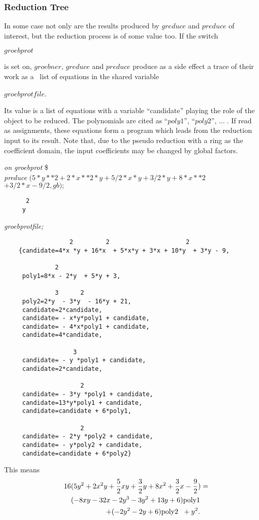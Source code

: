 \subsubsection{Reduction Tree}
In some case not only are the results produced by $greduce$ and
$preduce$ of interest, but the reduction process is of some value
too. If the switch
\begin{center}
$groebprot$
\end{center}
is set on, $groebner$, $greduce$ and $preduce$ produce as a side effect
a trace of their work as a \REDUCE \  list of equations in the shared variable
\begin{center}
$groebprotfile$.
\end{center}
Its value is a list of equations with a variable ``candidate'' playing
the role of the object to be reduced. The polynomials are cited as
``$poly1$'', ``$poly2$'', $\ldots\;$. If read as assignments, these equations
form a program which leads from the reduction input to its result.
Note that, due to the pseudo reduction with a ring as the coefficient
domain, the input coefficients may be changed by global factors.

\newpage

\example {}

{\it on groebprot} \$ \\
{\it preduce} $ (5*y**2 + 2*x**2*y + 5/2*x*y + 3/2*y + 8*x**2 $ \\
\hspace*{+1cm} $+ 3/2*x - 9/2, gb);$
\begin{verbatim}
      2
     y
\end{verbatim}
{\it groebprotfile;}
\begin{verbatim}
                  2         2                     2
    {candidate=4*x *y + 16*x  + 5*x*y + 3*x + 10*y  + 3*y - 9,

              2
     poly1=8*x - 2*y  + 5*y + 3,

              3      2
     poly2=2*y  - 3*y  - 16*y + 21,
     candidate=2*candidate,
     candidate= - x*y*poly1 + candidate,
     candidate= - 4*x*poly1 + candidate,
     candidate=4*candidate,

                   3
     candidate= - y *poly1 + candidate,
     candidate=2*candidate,

                     2
     candidate= - 3*y *poly1 + candidate,
     candidate=13*y*poly1 + candidate,
     candidate=candidate + 6*poly1,

                     2
     candidate= - 2*y *poly2 + candidate,
     candidate= - y*poly2 + candidate,
     candidate=candidate + 6*poly2}

 \end{verbatim}
This means
\begin{eqnarray*}
\lefteqn{
16 (5 y^2 + 2 x^2 y + \frac{5}{2} x y + \frac{3}{2} y
+ 8 x^2+ \frac{3}{2} x - \frac{9}{2})=} \\ & &
(-8 x y -32 x -2 y^3 -3 y^2 + 13 y + 6) \mbox{poly1} \\
& & \; + (-2 y^2 -2 y + 6) \mbox{poly2  } \; + y^2.
\end{eqnarray*}


